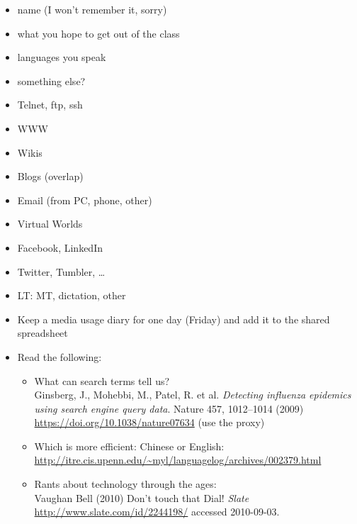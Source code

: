 \documentclass[a4paper,landscape,headrule,footrule,xetex]{foils}
\begin{document}









\begin{itemize}
\item name  (I won't remember it, sorry)
\item what you hope to get out of the class
\item languages you speak
\item something else?
\end{itemize}


\begin{itemize} \addtolength{\itemsep}{-0.5ex}
\item Telnet, ftp, ssh
\item WWW
\item Wikis
\item Blogs (overlap)
\item Email (from PC, phone, other)
\item Virtual Worlds
\item Facebook, LinkedIn
\item Twitter, Tumbler, \ldots
\item LT: MT, dictation, other
\end{itemize}



\begin{itemize}
\item Keep a media usage diary for one day (Friday) and add it to the shared spreadsheet

\item Read the following:
  \begin{itemize}
  \item What can search terms tell us?  \\ Ginsberg, J., Mohebbi, M.,
    Patel, R. et al. \textit{Detecting influenza epidemics using search
    engine query data}. Nature 457, 1012–1014 (2009)
    \url{https://doi.org/10.1038/nature07634} (use the proxy)
  \item Which is more efficient: Chinese or English:
    \\ \url{http://itre.cis.upenn.edu/~myl/languagelog/archives/002379.html}
  \item Rants about technology through the ages: 
    \\ Vaughan Bell (2010) Don't touch that Dial! \textit{Slate}
    \\ \url{http://www.slate.com/id/2244198/} accessed 2010-09-03. 
  \end{itemize}
  
\end{itemize}


\end{document}
